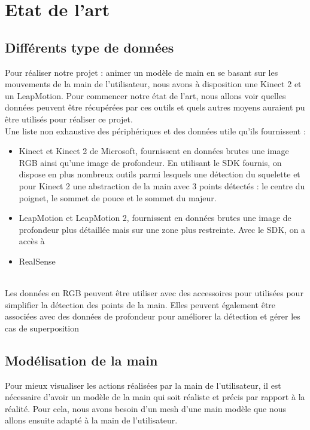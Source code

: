 \chapter{Etat de l'art}

\section{Différents type de données}
Pour réaliser notre projet : animer un modèle de main en se basant sur les mouvements de la main de l'utilisateur, nous avons à disposition une 
Kinect 2 et un LeapMotion. Pour commencer notre état de l'art, nous allons voir quelles données peuvent être récupérées par ces outils et 
quels autres moyens auraient pu être utilisés pour réaliser ce projet.\\

Une liste non exhaustive des périphériques et des données utile qu'ils fournissent : 
\begin{itemize}
\item Kinect et Kinect 2 de Microsoft, fournissent en données brutes une image RGB ainsi qu'une image de profondeur. 
En utilisant le SDK fournis, on dispose en plus nombreux outils parmi lesquels une détection du squelette et pour Kinect 2 
une abstraction de la main avec 3 points détectés : le centre du poignet, le sommet de pouce et le sommet du majeur. 
\item LeapMotion et LeapMotion 2, fournissent en données brutes une image de profondeur plus détaillée mais sur une zone 
plus restreinte. Avec le SDK, on a accès à 
\item RealSense 
\end{itemize}
\ \\
Les données en RGB peuvent être utiliser avec des accessoires pour utilisées pour simplifier la détection des points de la main. \cite{wang2009real} 
Elles peuvent également être associées avec des données de profondeur pour améliorer la détection et gérer les cas de superposition \cite{van2011combining}

\section{Modélisation de la main}
Pour mieux visualiser les actions réalisées par la main de l'utilisateur, il est nécessaire d'avoir
un modèle de la main qui soit réaliste et précis par rapport à la réalité. Pour cela, nous avons besoin d'un
mesh d'une main modèle que nous allons ensuite adapté à la main de l'utilisateur.\\

